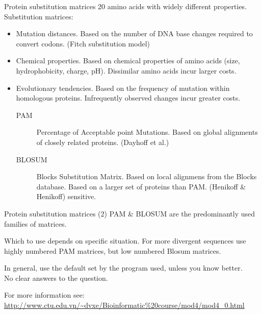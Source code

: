 \documentclass[pdf]{beamer}
\begin{document}
\begin{frame}{Protein substitution matrices}
  20 amino acids with widely different properties.
  Substitution matrices:
  {\small
  \begin{itemize}
  \item Mutation distances. Based on the number of DNA base changes required to convert
    codons. (Fitch substitution model)
  \item Chemical properties. Based on chemical properties of amino acids
    (size, hydrophobicity, charge, pH). Dissimilar amino acids incur larger costs.
  \item Evolutionary tendencies. Based on the frequency of mutation within
    homologous proteins. Infrequently observed changes incur greater costs.
    \begin{description}
    \item[PAM] Percentage of Acceptable point Mutations. Based on global alignments of closely
      related proteins. (Dayhoff et al.)
    \item[BLOSUM] Blocks Substitution Matrix. Based on local alignmens from the
      Blocks database. Based on a larger set of proteins than PAM. (Henikoff \& Henikoff)
      sensitive.
    \end{description}
  \end{itemize}
  }
\end{frame}

\begin{frame}{Protein substitution matrices (2)}
  PAM \& BLOSUM are the predominantly used families of matrices.

  Which to use depends on specific situation. For more divergent sequences
  use highly numbered PAM matrices, but low numbered Blosum matrices.

  In general, use the default set by the program used, unless you know
  better.\\
  No clear answers to the question. 

  For more information see:\\
  \url{http://www.ctu.edu.vn/~dvxe/Bioinformatic\%20course/mod4/mod4_0.html}
  
\end{frame}
\end{document}
